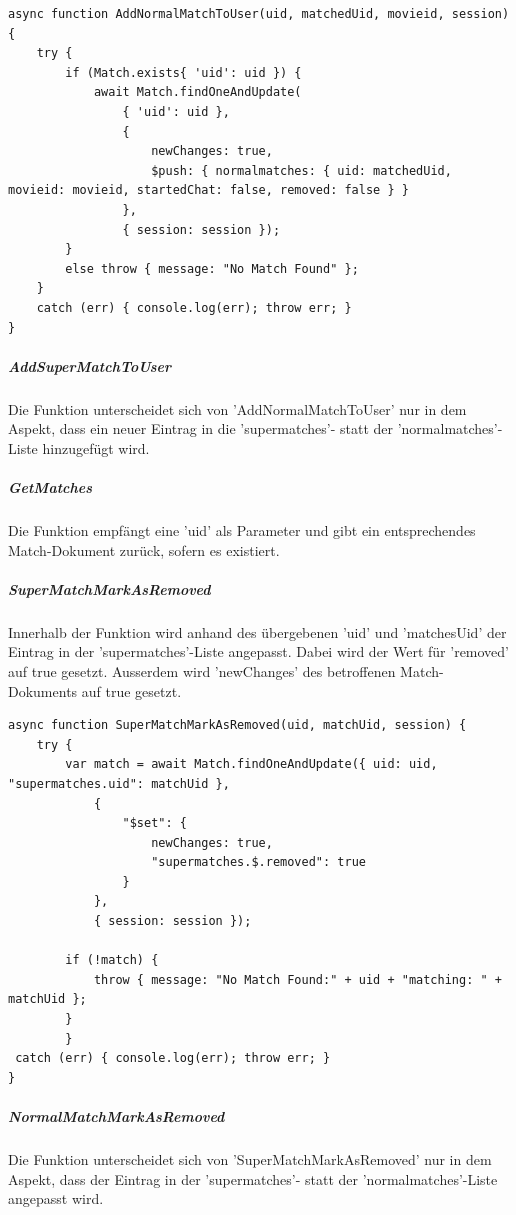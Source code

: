 \begin{lstlisting}[caption=Match Service - AddNormalMatchToUser, label=lst:matchserviceAddNormalMatchToUser]
async function AddNormalMatchToUser(uid, matchedUid, movieid, session) {
    try {
        if (Match.exists{ 'uid': uid }) {
            await Match.findOneAndUpdate(
                { 'uid': uid },
                {
                    newChanges: true,
                    $push: { normalmatches: { uid: matchedUid, movieid: movieid, startedChat: false, removed: false } }
                },
                { session: session });
        }
        else throw { message: "No Match Found" };
    }
    catch (err) { console.log(err); throw err; }
}
\end{lstlisting}

\subparagraph{AddSuperMatchToUser}
Die Funktion unterscheidet sich von 'AddNormalMatchToUser' nur in dem Aspekt, dass ein neuer Eintrag in die 'supermatches'- statt der 'normalmatches'-Liste hinzugefügt wird.

\subparagraph{GetMatches}
Die Funktion empfängt eine 'uid' als Parameter und gibt ein entsprechendes Match-Dokument zurück, sofern es existiert.

\subparagraph{SuperMatchMarkAsRemoved}
Innerhalb der Funktion wird anhand des übergebenen 'uid' und 'matchesUid' der Eintrag in der 'supermatches'-Liste angepasst. Dabei wird der Wert für 'removed' auf true gesetzt. Ausserdem wird 'newChanges' des betroffenen Match-Dokuments auf true gesetzt.

\begin{lstlisting}[caption=Match Service - SuperMatchMarkAsRemoved, label=lst:matchserviceSuperMatchMarkAsRemoved]
async function SuperMatchMarkAsRemoved(uid, matchUid, session) {
    try {
        var match = await Match.findOneAndUpdate({ uid: uid, "supermatches.uid": matchUid },
            {
                "$set": {
                    newChanges: true,
                    "supermatches.$.removed": true
                }
            },
            { session: session });

        if (!match) {
            throw { message: "No Match Found:" + uid + "matching: " + matchUid };
        }
        }
 catch (err) { console.log(err); throw err; }
}
\end{lstlisting}

\subparagraph{NormalMatchMarkAsRemoved}
Die Funktion unterscheidet sich von 'SuperMatchMarkAsRemoved' nur in dem Aspekt, dass der  Eintrag in der 'supermatches'- statt der 'normalmatches'-Liste angepasst wird.

